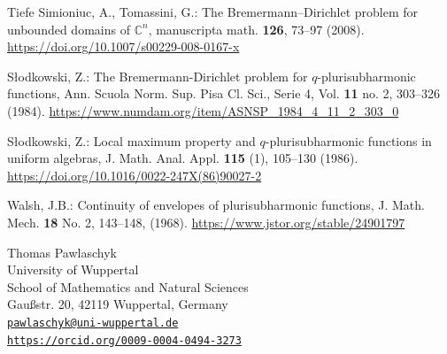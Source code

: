\documentclass[reqno]{amsart}
\theoremstyle{definition}
\numberwithin{equation}{section}
\begin{document}
\begin{thebibliography}{Tiefe}
Simioniuc, A., Tomassini, G.: The Bremermann–Dirichlet problem for unbounded domains of $\mathbb{C}^n$, manuscripta math. \textbf{126}, 73–97 (2008). \href{https://doi.org/10.1007/s00229-008-0167-x}{https://doi.org/10.1007/s00229-008-0167-x}

S{\l}odkowski, Z.: The Bremermann-Dirichlet problem for $q$-plurisubharmonic functions, Ann. Scuola Norm. Sup. Pisa Cl. Sci., Serie 4, Vol. \textbf{11} no. 2, 303--326 (1984). \href{https://www.numdam.org/item/ASNSP\_1984\_4\_11\_2\_303\_0}{https://www.numdam.org/item/ASNSP\_1984\_4\_11\_2\_303\_0}

S{\l}odkowski, Z.: Local maximum property and $q$-plurisubharmonic functions in uniform algebras, J. Math. Anal. Appl. \textbf{115} (1), 105--130 (1986). \href{https://doi.org/10.1016/0022-247X(86)90027-2}{https://doi.org/10.1016/0022-247X(86)90027-2}

Walsh, J.B.: Continuity of envelopes of plurisubharmonic functions, J. Math. Mech. \textbf{18} No. 2, 143--148, (1968). \href{https://www.jstor.org/stable/24901797}{https://www.jstor.org/stable/24901797}

\end{thebibliography}

\vspace{1cm}

Thomas Pawlaschyk\\
University of Wuppertal\\
School of Mathematics and Natural Sciences\\
Gau{\ss}str. 20, 42119 Wuppertal, Germany\\
\href{mailto:pawlaschyk@uni-wuppertal.de}{\texttt{pawlaschyk@uni-wuppertal.de}}\\
\texttt{\href{https://orcid.org/0009-0004-0494-3273}{https://orcid.org/0009-0004-0494-3273}}\\
\end{document}
